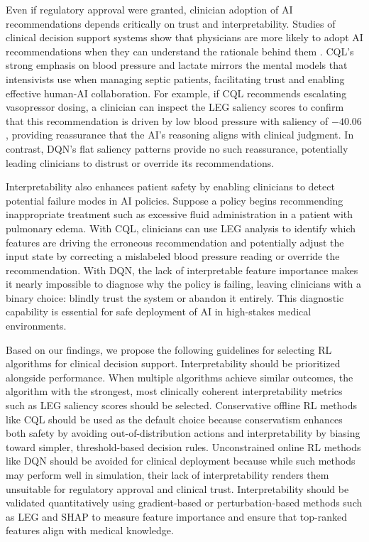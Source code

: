 Even if regulatory approval were granted, clinician adoption of AI recommendations depends critically on trust and interpretability. Studies of clinical decision support systems show that physicians are more likely to adopt AI recommendations when they can understand the rationale behind them \citep{shortliffe2018cdss}. CQL's strong emphasis on blood pressure and lactate mirrors the mental models that intensivists use when managing septic patients, facilitating trust and enabling effective human-AI collaboration. For example, if CQL recommends escalating vasopressor dosing, a clinician can inspect the LEG saliency scores to confirm that this recommendation is driven by low blood pressure with saliency of $-40.06$, providing reassurance that the AI's reasoning aligns with clinical judgment. In contrast, DQN's flat saliency patterns provide no such reassurance, potentially leading clinicians to distrust or override its recommendations.

Interpretability also enhances patient safety by enabling clinicians to detect potential failure modes in AI policies. Suppose a policy begins recommending inappropriate treatment such as excessive fluid administration in a patient with pulmonary edema. With CQL, clinicians can use LEG analysis to identify which features are driving the erroneous recommendation and potentially adjust the input state by correcting a mislabeled blood pressure reading or override the recommendation. With DQN, the lack of interpretable feature importance makes it nearly impossible to diagnose why the policy is failing, leaving clinicians with a binary choice: blindly trust the system or abandon it entirely. This diagnostic capability is essential for safe deployment of AI in high-stakes medical environments.

Based on our findings, we propose the following guidelines for selecting RL algorithms for clinical decision support. Interpretability should be prioritized alongside performance. When multiple algorithms achieve similar outcomes, the algorithm with the strongest, most clinically coherent interpretability metrics such as LEG saliency scores should be selected. Conservative offline RL methods like CQL should be used as the default choice because conservatism enhances both safety by avoiding out-of-distribution actions and interpretability by biasing toward simpler, threshold-based decision rules. Unconstrained online RL methods like DQN should be avoided for clinical deployment because while such methods may perform well in simulation, their lack of interpretability renders them unsuitable for regulatory approval and clinical trust. Interpretability should be validated quantitatively using gradient-based or perturbation-based methods such as LEG and SHAP to measure feature importance and ensure that top-ranked features align with medical knowledge.


